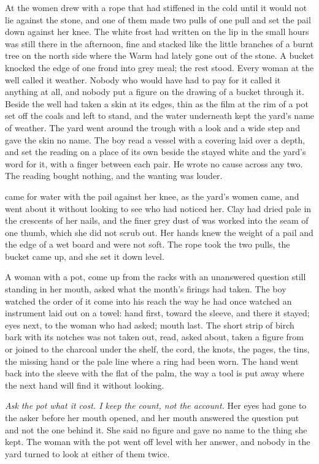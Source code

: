 At  the women drew with a rope that had stiffened in the cold until it would not lie against the stone, and one of them made two pulls of one pull and set the pail down against her knee. The white frost had written on the lip in the small hours was still there in the afternoon, fine and stacked like the little branches of a burnt tree on the north side where the Warm had lately gone out of the stone. A bucket knocked the edge of one frond into grey meal; the rest stood. Every woman at the well called it weather. Nobody who would have had to pay for it called it anything at all, and nobody put a figure on the drawing of a bucket through it. Beside the well  had taken a skin at its edges, thin as the film at the rim of a pot set off the coals and left to stand, and the water underneath kept the yard's name of weather. The yard went around the trough with a look and a wide step and gave the skin no name. The boy read a vessel with a covering laid over a depth, and set the reading on a place of its own beside the stayed white and the yard's word for it, with a finger between each pair. He wrote no cause across any two. The reading bought nothing, and the wanting was louder.

 came for water with the pail against her knee, as the yard's women came, and went about it without looking to see who had noticed her. Clay had dried pale in the crescents of her nails, and the finer grey dust of  was worked into the seam of one thumb, which she did not scrub out. Her hands knew the weight of a pail and the edge of a wet board and were not soft. The rope took the two pulls, the bucket came up, and she set it down level.

A woman with a pot, come up from the racks with an unanswered question still standing in her mouth, asked what the month's firings had taken. The boy watched the order of it come into his reach the way he had once watched an instrument laid out on a towel: hand first, toward the sleeve, and there it stayed; eyes next, to the woman who had asked; mouth last. The short strip of birch bark with its notches was not taken out, read, asked about, taken a figure from or joined to the charcoal under the shelf, the cord, the knots, the pages, the tins, the missing hand or the pale line where a ring had been worn. The hand went back into the sleeve with the flat of the palm, the way a tool is put away where the next hand will find it without looking.

\emph{Ask the pot what it cost. I keep the count, not the account.} Her eyes had gone to the asker before her mouth opened, and her mouth answered the question put and not the one behind it. She said no figure and gave no name to the thing she kept. The woman with the pot went off level with her answer, and nobody in the yard turned to look at either of them twice.


